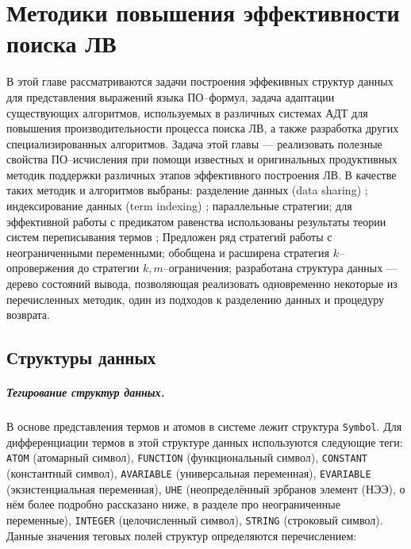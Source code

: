 \chapter{Методики повышения эффективности поиска ЛВ}
\label{part:two}

В этой главе рассматриваются задачи построения эффекивных структур данных для представления выражений языка ПО--формул, задача адаптации существующих алгоритмов, используемых в различных системах АДТ для повышения производительности процесса поиска ЛВ, а также разработка других специализированных алгоритмов. Задача этой главы --- реализовать полезные свойства ПО--исчисления при помощи известных и оригинальных продуктивных методик поддержки различных этапов эффективного построения ЛВ. В качестве таких методик и алгоритмов выбраны: разделение данных (data sharing) \cite{Che2, Ryazanov2003}; индексирование данных (term indexing) \cite{HARIndex, TermIndexingBook,pathindex}; параллельные стратегии; для эффективной работы с предикатом равенства использованы результаты теории систем переписывания термов \cite{Nipkow}; Предложен ряд стратегий работы с неограниченными переменными; обобщена и расширена стратегия $k$--опровержения \cite{ICDS2000, dissChe} до стратегии $k,m$--ограничения; разработана структура данных --- дерево состояний вывода, позволяющая реализовать одновременно некоторые из перечисленных методик, один из подходов к разделению данных и процедуру возврата.


\section{Структуры данных}


\paragraph{Тегирование структур данных.}
В основе представления термов и атомов в системе лежит структура \texttt{Symbol}. %
Для дифференциации термов в этой структуре данных используются следующие теги: \texttt{ATOM} (атомарный символ), \texttt{FUNCTION} (функциональный символ), \texttt{CONSTANT} (константный символ), \linebreak \texttt{AVARIABLE} (универсальная переменная), \texttt{EVARIABLE} (экзистенциальная переменная), \texttt{UHE} (неопределённый эрбранов элемент (НЭЭ), о нём более подробно рассказано ниже, в разделе про неограниченные переменные), \texttt{INTEGER} (целочисленный символ), \texttt{STRING} (строковый символ). Данные значения теговых полей структур определяются перечислением:


